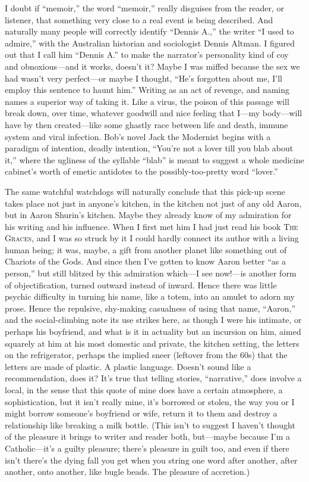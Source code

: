 \documentclass[
]{memoir}
\begin{document}
I doubt if ``memoir,'' the word ``memoir,'' really disguises from the
reader, or listener, that something very close to a real event is being
described. And naturally many people will correctly identify ``Dennis
A.,'' the writer ``I used to admire,'' with the Australian historian and
sociologist Dennis Altman. I figured out that I call him ``Dennis A.''
to make the narrator's personality kind of coy and obnoxious---and it
works, doesn't it? Maybe I was miffed because the sex we had wasn't very
perfect---or maybe I thought, ``He's forgotten about me, I'll employ
this sentence to haunt him.'' Writing as an act of revenge, and naming
names a superior way of taking it. Like a virus, the poison of this
passage will break down, over time, whatever goodwill and nice feeling
that I---my body---will have by then created---like some ghastly race
between life and death, immune system and viral infection. Bob's novel
Jack the Modernist begins with a paradigm of intention, deadly
intention, ``You're not a lover till you blab about it,'' where the
ugliness of the syllable ``blab'' is meant to suggest a whole medicine
cabinet's worth of emetic antidotes to the possibly-too-pretty word
``lover.''

The same watchful watchdogs will naturally conclude that this pick-up
scene takes place not just in anyone's kitchen, in the kitchen not just
of any old Aaron, but in Aaron Shurin's kitchen. Maybe they already know
of my admiration for his writing and his influence. When I first met him
I had just read his book \textsc{The Graces}, and I was so struck by it
I could hardly connect its author with a living human being; it was,
maybe, a gift from another planet like something out of Chariots of the
Gods. And since then I've gotten to know Aaron better ``as a person,''
but still blitzed by this admiration which---I see now!---is another
form of objectification, turned outward instead of inward. Hence there
was little psychic difficulty in turning his name, like a totem, into an
amulet to adorn my prose. Hence the repulsive, shy-making casualness of
using that name, ``Aaron,'' and the social-climbing note its use strikes
here, as though I were his intimate, or perhaps his boyfriend, and what
is it in actuality but an incursion on him, aimed squarely at him at his
most domestic and private, the kitchen setting, the letters on the
refrigerator, perhaps the implied sneer (leftover from the 60s) that the
letters are made of plastic. A plastic language. Doesn't sound like a
recommendation, does it? It's true that telling stories, ``narrative,''
does involve a local, in the sense that this quote of mine does have a
certain atmosphere, a sophistication, but it isn't really mine, it's
borrowed or stolen, the way you or I might borrow someone's boyfriend or
wife, return it to them and destroy a relationship like breaking a milk
bottle. (This isn't to suggest I haven't thought of the pleasure it
brings to writer and reader both, but---maybe because I'm a
Catholic---it's a guilty pleasure; there's pleasure in guilt too, and
even if there isn't there's the dying fall you get when you string one
word after another, after another, onto another, like bugle beads. The
pleasure of accretion.)
\end{document}
